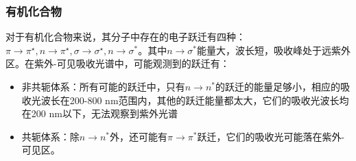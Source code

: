 \subsubsection*{有机化合物}
对于有机化合物来说，其分子中存在的电子跃迁有四种：$\pi \rightarrow \pi^{\star},n\rightarrow \pi^{\star},\sigma \rightarrow  \sigma^{\star},n\rightarrow \sigma^{*}$。其中$n\rightarrow\sigma^{*}$能量大，波长短，吸收峰处于远紫外区。在紫外-可见吸收光谱中，可能观测到的跃迁有：
\begin{itemize}
    \item 非共轭体系：所有可能的跃迁中，只有$n\rightarrow n^{*}$的跃迁的能量足够小，相应的吸收光波长在200-800 nm范围内，其他的跃迁能量都太大，它们的吸收光波长均在200 nm以下，无法观察到紫外光谱
    \item 共轭体系：除$n\rightarrow n^{*}$外，还可能有$\pi \rightarrow \pi^{*}$跃迁，它们的吸收光可能落在紫外-可见区。
\end{itemize}

